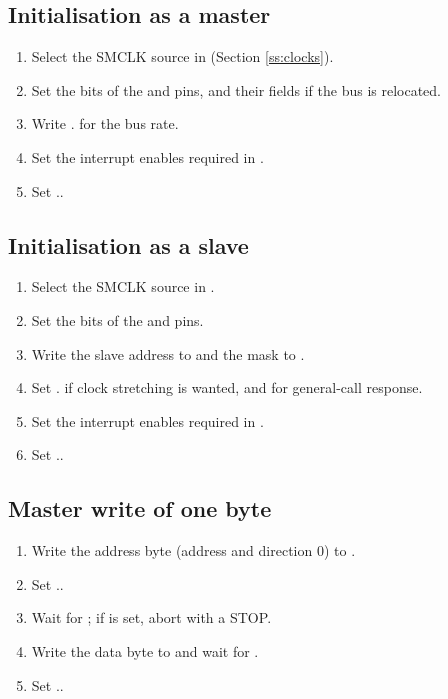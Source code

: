 \subsection{Initialisation as a master}

\begin{enumerate}
	\item Select the SMCLK source in  (Section \ref{ss:clocks}).
	\item Set the  bits of the  and  pins, and their  fields if the bus is relocated.
	\item Write . for the bus rate.
	\item Set the interrupt enables required in .
	\item Set ..
\end{enumerate}

\subsection{Initialisation as a slave}

\begin{enumerate}
	\item Select the SMCLK source in .
	\item Set the  bits of the  and  pins.
	\item Write the slave address to  and the mask to .
	\item Set . if clock stretching is wanted, and  for general-call response.
	\item Set the interrupt enables required in .
	\item Set ..
\end{enumerate}

\subsection{Master write of one byte}

\begin{enumerate}
	\item Write the address byte (address and direction 0) to .
	\item Set ..
	\item Wait for ; if  is set, abort with a STOP.
	\item Write the data byte to  and wait for .
	\item Set ..
\end{enumerate}

